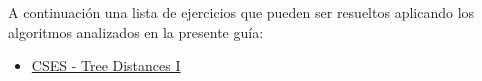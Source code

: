 A continuación una lista de ejercicios que pueden ser resueltos aplicando los algoritmos analizados en la presente guía:

\begin{itemize}
	\item \href{https://cses.fi/problemset/task/1132/}{CSES - Tree Distances I}
\end{itemize}